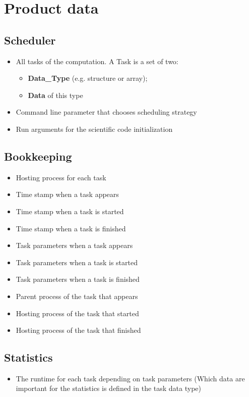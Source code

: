 {


\setcounter{funcD}{10}
\renewcommand{\labelitemi}{
	\ifnum \value{funcD}<10$/D 0\arabic{funcD} /$\addtocounter{funcD}{10}
	\else $/D \arabic{funcD} /$\addtocounter{funcD}{10}\fi
	}
\section{Product data}

	\subsection{Scheduler}
		\begin{itemize}
			\item All tasks of the computation. A Task is a set of two:
				\begin{itemize}
					\item \textbf{Data\_Type} (e.g. structure or array);
					\item \textbf{Data} of this type
				\end{itemize}
			\item Command line parameter that chooses scheduling strategy
			\item Run arguments for the scientific code initialization
		\end{itemize}


	\subsection{Bookkeeping}
		\begin{itemize}
			\item Hosting process for each task
			\item Time stamp when a task appears
			\item Time stamp when a task is started
			\item Time stamp when a task is finished
			\item Task parameters when a task appears
			\item Task parameters when a task is started
			\item Task parameters when a task is finished
			\item Parent process of the task that appears
			\item Hosting process of the task that started
			\item Hosting process of the task that finished
		\end{itemize}
			
			
	\subsection{Statistics}
		\begin{itemize}
			\item The runtime for each task depending on task parameters (Which data are important for the statistics is defined in the task data type)
		\end{itemize}
}